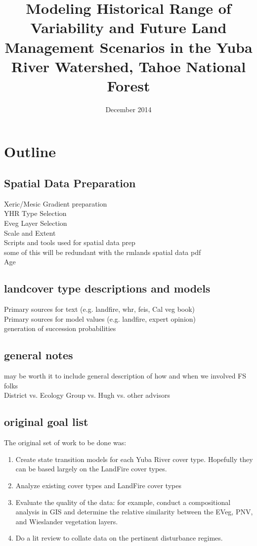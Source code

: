 \documentclass[12pt]{book}
\begin{document}
\title{Modeling Historical Range of Variability and Future Land Management Scenarios in the Yuba River Watershed, Tahoe National Forest}
\date{December 2014}

\section*{Outline}
\subsection{Spatial Data Preparation}
Xeric/Mesic Gradient preparation\\
YHR Type Selection\\
Eveg Layer Selection\\
Scale and Extent\\
Scripts and tools used for spatial data prep\\
some of this will be redundant with the rmlands spatial data pdf\\
Age

\subsection{landcover type descriptions and models}
Primary sources for text (e.g. landfire, whr, feis, Cal veg book)\\
Primary sources for model values (e.g. landfire, expert opinion)\\
generation of succession probabilities\\

\subsection{general notes}
may be worth it to include general description of how and when we involved FS folks\\
District vs. Ecology Group vs. Hugh vs. other advisors\\

\subsection{original goal list}

The original set of work to be done was:
\begin{enumerate}
\item{Create state transition models for each Yuba River cover type. Hopefully they can be based largely on the LandFire cover types.}
\item{Analyze existing cover types and LandFire cover types}
\item{Evaluate the quality of the data: for example, conduct a compositional analysis in GIS and determine the relative similarity between the EVeg, PNV, and Wieslander vegetation layers.}
\item{Do a lit review to collate data on the pertinent disturbance regimes.}
\end{enumerate}
\end{document}
